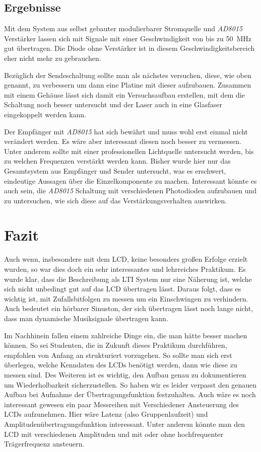\documentclass[12pt,a4paper]{article}
\begin{document}
\subsection{Ergebnisse}
Mit dem System aus selbst gebauter modulierbarer Stromquelle und \textit{AD8015} Verstärker lassen sich mit Signale mit einer Geschwindigkeit von bis zu \SI{50}{\mega\hertz} gut übertragen. Die Diode ohne Verstärker ist in diesem Geschwindigkeitsbereich eher nicht mehr zu gebrauchen.

Bezüglich der Sendeschaltung sollte man als nächstes versuchen, diese, wie oben genannt, zu verbessern um dann eine Platine mit dieser aufzubauen. Zusammen mit einem Gehäuse lässt sich damit ein Versuchsaufbau erstellen, mit dem die Schaltung noch besser untersucht und der Laser auch in eine Glasfaser eingekoppelt werden kann.

Der Empfänger mit \textit{AD8015} hat sich bewährt und muss wohl erst einmal nicht verändert werden. Es wäre aber interessant diesen noch besser zu vermessen. Unter anderem sollte mit einer professionellen Lichtquelle untersucht werden, bis zu welchen Frequenzen verstärkt werden kann. Bisher wurde hier nur das Gesamtsystem aus Empfänger und Sender untersucht, was es erschwert, eindeutige Aussagen über die Einzelkomponente zu machen. Interessant könnte es auch sein, die \textit{AD8015} Schaltung mit verschiedenen Photodioden aufzubauen und zu untersuchen, wie sich diese auf das Verstärkungsverhalten auswirken.

\section{Fazit}

Auch wenn, insbesondere mit dem LCD, keine besonders großen Erfolge erzielt wurden, so war dies doch ein sehr interessantes und lehrreiches Praktikum.
Es wurde klar, dass die Beschreibung als LTI System nur eine Näherung ist, welche sich nicht unbedingt gut auf das LCD übertragen lässt. Daraus folgt, dass es wichtig ist, mit Zufallsbitfolgen zu messen um ein Einschwingen zu verhindern. Auch bedeutet ein hörbarer Sinuston, der sich übertragen lässt noch lange nicht, dass man dynamische Musiksignale übertragen kann.

Im Nachhinein fallen einem zahlreiche Dinge ein, die man hätte besser machen können. So sei Studenten, die in Zukunft dieses Praktikum durchführen, empfohlen von Anfang an strukturiert vorzugehen. So sollte man sich erst überlegen, welche Kenndaten des LCDs benötigt werden, dann wie diese zu messen sind. Des Weiteren ist es wichtig, den Aufbau genau zu dokumentieren um Wiederholbarkeit sicherzustellen. So haben wir es leider verpasst den genauen Aufbau bei Aufnahme der Übertragungsfunktion festzuhalten.
Auch wäre es noch interessant gewesen ein paar Messreihen mit Verschiedener Ansteuerung des LCDs aufzunehmen. Hier wäre Latenz (also Gruppenlaufzeit) und Amplitudenübertragungsfunktion interessant. Unter anderem könnte man den LCD mit verschiedenen Amplituden und mit oder ohne hochfrequenter Trägerfrequenz ansteuern.
\end{document}
